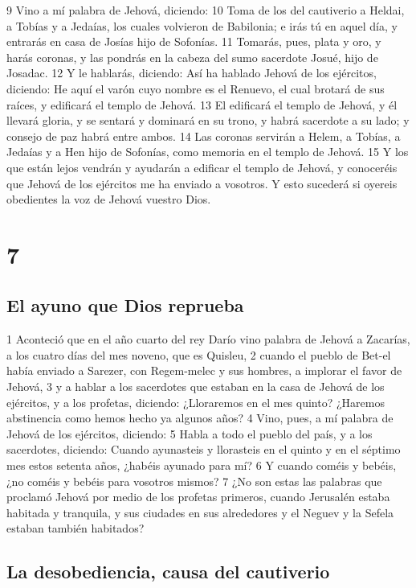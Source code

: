 9 Vino a mí palabra de Jehová, diciendo:
10 Toma de los del cautiverio a Heldai, a Tobías y a Jedaías, los cuales volvieron de Babilonia; e irás tú en aquel día, y entrarás en casa de Josías hijo de Sofonías.
11 Tomarás, pues, plata y oro, y harás coronas, y las pondrás en la cabeza del sumo sacerdote Josué, hijo de Josadac.
12 Y le hablarás, diciendo: Así ha hablado Jehová de los ejércitos, diciendo: He aquí el varón cuyo nombre es el Renuevo, el cual brotará de sus raíces, y edificará el templo de Jehová.
13 El edificará el templo de Jehová, y él llevará gloria, y se sentará y dominará en su trono, y habrá sacerdote a su lado; y consejo de paz habrá entre ambos.
14 Las coronas servirán a Helem, a Tobías, a Jedaías y a Hen hijo de Sofonías, como memoria en el templo de Jehová.
15 Y los que están lejos vendrán y ayudarán a edificar el templo de Jehová, y conoceréis que Jehová de los ejércitos me ha enviado a vosotros. Y esto sucederá si oyereis obedientes la voz de Jehová vuestro Dios.

\chapter{7}

\section*{El ayuno que Dios reprueba}

1 Aconteció que en el año cuarto del rey Darío vino palabra de Jehová a Zacarías, a los cuatro días del mes noveno, que es Quisleu,
2 cuando el pueblo de Bet-el había enviado a Sarezer, con Regem-melec y sus hombres, a implorar el favor de Jehová,
3 y a hablar a los sacerdotes que estaban en la casa de Jehová de los ejércitos, y a los profetas, diciendo: ¿Lloraremos en el mes quinto? ¿Haremos abstinencia como hemos hecho ya algunos años?
4 Vino, pues, a mí palabra de Jehová de los ejércitos, diciendo:
5 Habla a todo el pueblo del país, y a los sacerdotes, diciendo: Cuando ayunasteis y llorasteis en el quinto y en el séptimo mes estos setenta años, ¿habéis ayunado para mí?
6 Y cuando coméis y bebéis, ¿no coméis y bebéis para vosotros mismos?
7 ¿No son estas las palabras que proclamó Jehová por medio de los profetas primeros, cuando Jerusalén estaba habitada y tranquila, y sus ciudades en sus alrededores y el Neguev y la Sefela estaban también habitados?

\section*{La desobediencia, causa del cautiverio}

